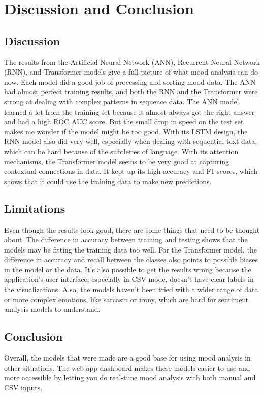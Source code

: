 \documentclass[11pt,a4paper]{article}
\begin{document}
\section{Discussion and Conclusion}

\subsection{Discussion}
The results from the Artificial Neural Network (ANN), Recurrent Neural Network (RNN), and Transformer models give a full picture of what mood analysis can do now. Each model did a good job of processing and sorting mood data. The ANN had almost perfect training results, and both the RNN and the Transformer were strong at dealing with complex patterns in sequence data.
The ANN model learned a lot from the training set because it almost always got the right answer and had a high ROC AUC score. But the small drop in speed on the test set makes me wonder if the model might be too good. With its LSTM design, the RNN model also did very well, especially when dealing with sequential text data, which can be hard because of the subtleties of language.
With its attention mechanisms, the Transformer model seems to be very good at capturing contextual connections in data. It kept up its high accuracy and F1-scores, which shows that it could use the training data to make new predictions.


\subsection{Limitations}
Even though the results look good, there are some things that need to be thought about. The difference in accuracy between training and testing shows that the models may be fitting the training data too well. For the Transformer model, the difference in accuracy and recall between the classes also points to possible biases in the model or the data.
It's also possible to get the results wrong because the application's user interface, especially in CSV mode, doesn't have clear labels in the visualizations. Also, the models haven't been tried with a wider range of data or more complex emotions, like sarcasm or irony, which are hard for sentiment analysis models to understand.


\subsection{Conclusion}
Overall, the models that were made are a good base for using mood analysis in other situations. The web app dashboard makes these models easier to use and more accessible by letting you do real-time mood analysis with both manual and CSV inputs.
\end{document}
